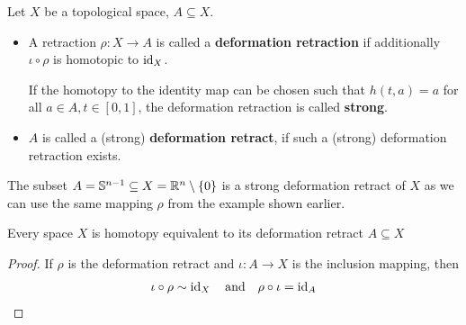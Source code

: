 \begin{dfn}[]
Let $X$ be a topological space, $A \subseteq X$.
\begin{itemize}
  \item A retraction $\rho: X \to A$ is called a \textbf{deformation retraction} if additionally $\iota \circ \rho$ is homotopic to $\operatorname{id}_X$.
    \begin{center}
    \end{center}
    If the homotopy to the identity map can be chosen such that $h(t,a) = a$ for all $a \in A, t \in [0,1]$, the deformation retraction is called \textbf{strong}.
  \item $A$ is called a (strong) \textbf{deformation retract}, if such a (strong) deformation retraction exists.
\end{itemize}
\end{dfn}

\begin{ex}[]
The subset $A = \mathbb{S}^{n-1} \subseteq X = \mathbb{R}^{n} \setminus \{0\}$ is a strong deformation retract of $X$ as we can use the same mapping $\rho$ from the example shown earlier.
\end{ex}

\begin{lem}[]
  Every space $X$ is homotopy equivalent to its deformation retract $A \subseteq X$
\end{lem}
\begin{proof}
If $\rho$ is the deformation retract and $\iota: A \to X$ is the inclusion mapping, then
\begin{align*}
  \iota \circ \rho \sim \operatorname{id}_X \quad \text{and} \quad \rho \circ \iota = \operatorname{id}_A
\end{align*}
\end{proof}


